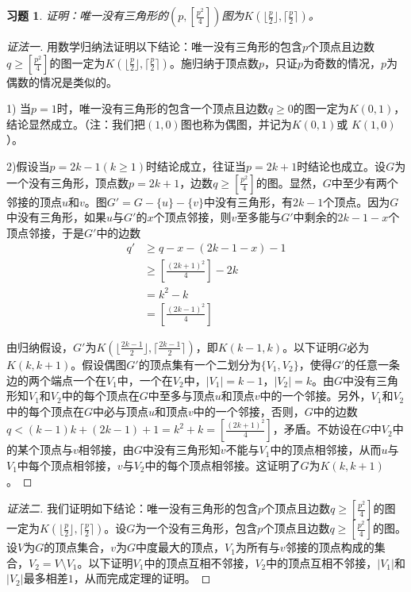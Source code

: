 \documentclass{article}
\begin{document}
\begin{CJK}{UTF8}{gbsn}
\newtheorem*{Ex}{习题}
  \begin{Ex}
      证明：唯一没有三角形的$(p,[\frac{p^2}{4}])$图为$K(\lfloor \frac{p}{2} \rfloor,\lceil \frac{p}{2} \rceil )$。
\end{Ex}
\begin{proof}[证法一]用数学归纳法证明以下结论：唯一没有三角形的包含$p$个顶点且边数$q\geq [\frac{p^2}{4}]$的图一定为$K(\lfloor \frac{p}{2} \rfloor,\lceil \frac{p}{2} \rceil )$。施归纳于顶点数$p$，只证$p$为奇数的情况，$p$为偶数的情况是类似的。

  1) 当$p=1$时，唯一没有三角形的包含一个顶点且边数$q\geq 0$的图一定为$K(0,1)$，结论显然成立。（注：我们把$(1,0)$图也称为偶图，并记为$K(0,1)$或 $K(1,0)$）。

  

  2)假设当$p=2k-1(k\geq 1)$时结论成立，往证当$p=2k+1$时结论也成立。设$G$为一个没有三角形，顶点数$p=2k+1$，边数$q \geq [\frac{p^2}{4}]$的图。显然，$G$中至少有两个邻接的顶点$u$和$v$。图$G'=G-\{u\}-\{v\}$中没有三角形，有$2k-1$个顶点。因为$G$中没有三角形，如果$u$与$G'$的$x$个顶点邻接，则$v$至多能与$G'$中剩余的$2k-1-x$个顶点邻接，于是$G'$中的边数
  \begin{equation*}
    \begin{split}
      q'&\geq q - x - (2k-1-x) - 1\\
      &\geq [\frac{(2k+1)^2}{4}]-2k\\
      &=k^2-k\\
      &=[\frac{(2k-1)^2}{4}]
    \end{split}
  \end{equation*}

  由归纳假设，$G'$为$K(\lfloor \frac{2k-1}{2} \rfloor,\lceil \frac{2k-1}{2} \rceil )$，即$K(k-1,k)$。以下证明$G$必为$K(k,k+1)$。假设偶图$G'$的顶点集有一个二划分为$\{V_1,V_2\}$，使得$G'$的任意一条边的两个端点一个在$V_1$中，一个在$V_2$中，$|V_1|=k-1$，$|V_2|=k$。由$G$中没有三角形知$V_1$和$V_2$中的每个顶点在$G$中至多与顶点$u$和顶点$v$中的一个邻接。另外，$V_1$和$V_2$中的每个顶点在$G$中必与顶点$u$和顶点$v$中的一个邻接，否则，$G$中的边数$q < (k-1)k + (2k-1) + 1 = k^2 + k = [\frac{(2k+1)^2}{4}]$，矛盾。不妨设在$G$中$V_2$中的某个顶点与$v$相邻接，由$G$中没有三角形知$v$不能与$V_1$中的顶点相邻接，从而$u$与$V_1$中每个顶点相邻接，$v$与$V_2$中的每个顶点相邻接。这证明了$G$为$K(k,k+1)$。
  
  
\end{proof}

\begin{proof}[证法二]我们证明如下结论：唯一没有三角形的包含$p$个顶点且边数$q\geq [\frac{p^2}{4}]$的图一定为$K(\lfloor \frac{p}{2} \rfloor,\lceil \frac{p}{2} \rceil )$。设$G$为一个没有三角形，包含$p$个顶点且边数$q\geq [\frac{p^2}{4}]$的图。设$V$为$G$的顶点集合，$v$为$G$中度最大的顶点，$V_1$为所有与$v$邻接的顶点构成的集合，$V_2=V\setminus V_1$。以下证明$V_1$中的顶点互相不邻接，$V_2$中的顶点互相不邻接，$|V_1|$和$|V_2|$最多相差$1$，从而完成定理的证明。


\end{proof}
\end{CJK}
\end{document}
